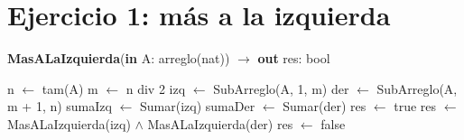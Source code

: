 \section{Ejercicio 1: más a la izquierda}

\begin{algorithm}[H]
\caption{
    \textbf{MasALaIzquierda}(\textbf{in} A: arreglo(nat)) $\to$ \textbf{out} res: bool
}
\begin{algorithmic}[1]
    \State n $\gets$ tam(A)
    \State m $\gets$ n div 2
    \State izq $\gets$ SubArreglo(A, 1, m) 
    \State der $\gets$ SubArreglo(A, m + 1, n) 
    \State sumaIzq $\gets$ Sumar(izq) 
    \State sumaDer $\gets$ Sumar(der) 
            \State res $\gets$ true
        \Else
            \State res $\gets$ MasALaIzquierda(izq) $\land$ MasALaIzquierda(der)
        \EndIf
    \Else
        \State res $\gets$ false
    \EndIf
\end{algorithmic}
\end{algorithm}
